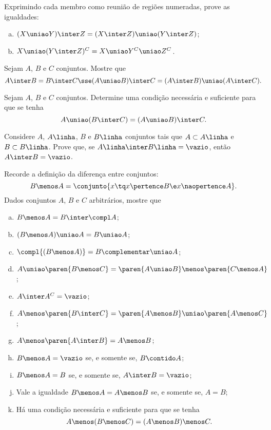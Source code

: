 \begin{exercise}
  Exprimindo cada membro como reunião de regiões numeradas, prove as igualdades:
  \begin{enumerate}[a)]
    \item $(X \uniao Y) \inter Z = (X \inter Z) \uniao (Y \inter Z)$;
    \item $X \uniao (Y \inter Z )^C = X \uniao Y^C \uniao Z^C$.
  \end{enumerate}
\end{exercise}

\begin{exercise}
  Sejam $A$, $B$ e $C$ conjuntos. Mostre que 
  $$A \inter B = B \inter C \sse (A \uniao B) \inter C =(A \inter B) \uniao (A \inter C). $$
\end{exercise}

\begin{exercise}
  Sejam $A$, $B$ e $C$ conjuntos. Determine uma condição necessária e suficiente para que se tenha 
  \[
    A \uniao (B \inter C) = (A \uniao B) \inter C.
  \]
\end{exercise}

\begin{exercise}
  Considere $A$, $A\linha$, $B$ e $B\linha$ conjuntos tais que $A  \subset A\linha$ e 
  $B \subset B\linha$. Prove que, se $A\linha \inter B\linha=\vazio$, então
  $A\inter B = \vazio$.  
\end{exercise}

\begin{exercise}
  Recorde a definição da diferença entre conjuntos:
  \[
    B \menos A = \conjunto{ x \tq x \pertence B \e x \naopertence A}.
  \]
  Dados conjuntos $A$, $B$ e $C$ arbitrários, mostre que
  \begin{enumerate}[a)]
    \item $B \menos A = B \inter \compl A$;
    \item $(B \menos A) \uniao A = B \uniao A$;
    \item $\compl{(B \menos A)} = B\complementar \uniao A$;
    \item $A \uniao \paren{ B \menos C } = \paren{A \uniao B } \menos \paren{C \menos A }$;
    \item $A \inter A^C = \vazio$;
    \item $A \menos \paren{B \inter C } = \paren{A \menos B } \uniao \paren{A \menos C }$;
    \item $A \menos \paren{ A \inter B } = A \menos B$;
    \item $B \menos A = \vazio$ se, e somente se, $B \contido A$;
    \item $B \menos A = B$ se, e somente se, $A \inter B = \vazio$;
    \item Vale a igualdade $B \menos A = A \menos B$ se, e somente se, $A = B$;
    \item Há uma condição necessária e suficiente para que se tenha \[A \menos (B \menos C) = (A \menos B) \menos C.\]
  \end{enumerate}
\end{exercise}

